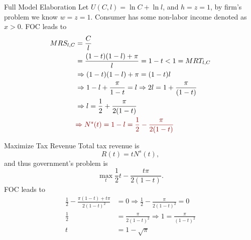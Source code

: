 \documentclass[11pt,aspectratio=169,usenames,dvipsnames]{beamer}
\newcommand{\red}[1]{\textcolor{red}{#1}}
\begin{document}
\begin{frame}{Full Model Elaboration}
\label{slide:Full_Model_Elaboration}
    Let $ U( C, l ) = \ln C + \ln l $, and $ h = z = 1 $, by firm's problem we know $ w = z = 1 $.
    Consumer has some non-labor income denoted as $ x > 0 $. FOC leads to
    \begin{align*}
        MRS_{l, C}
            & = \frac{C}{l}
        \\
            & = \frac{( 1-t )( 1-l ) + \pi}{l} = 1 - t < 1 = MRT_{l, C}
        \\
            & \Rightarrow ( 1-t )( 1-l ) + \pi = ( 1-t )l
        \\
            & \Rightarrow 1-l + \frac{\pi}{1-t} = l \Rightarrow 2 l = 1 + \frac{\pi}{(1-t)}
        \\
            & \Rightarrow l = \frac{1}{2} + \frac{\pi}{2(1-t)}
        \\
            & \red{ \Rightarrow N^{s} ( t ) = 1-l = \frac{1}{2} - \frac{\pi}{2(1-t)} }
    \end{align*}
\end{frame}

\begin{frame}{Maximize Tax Revenue}
\label{slide:Maximize_Tax_Revenue}
    Total tax revenue is
    \begin{equation*}
       R( t ) = t N^{s}( t )
    ,\end{equation*}
    and thus government's problem is
    \begin{equation*}
       \max_{t} \frac{1}{2}t - \frac{t\pi}{2(1-t)}
    .\end{equation*}
    FOC leads to
    \begin{align*}
        \frac{1}{2} - \frac{\pi(1-t) + t\pi}{2(1-t)^{2}}
            & = 0 \Rightarrow \frac{1}{2} - \frac{\pi}{2(1-t)^{2}} = 0
        \\
        \frac{1}{2}
            & = \frac{\pi}{2(1-t)^{2}} \Rightarrow 1 = \frac{\pi}{(1-t)^{2}}
        \\
        t
            & = 1 - \sqrt{\pi}
    \end{align*}
\end{frame}
\end{document}
